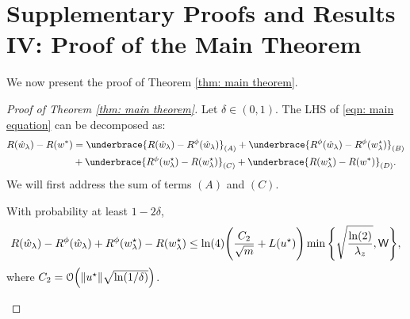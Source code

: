 \section{Supplementary Proofs and Results IV: Proof of the Main Theorem}

We now present the proof of Theorem \ref{thm: main theorem}.

\begin{proof}[Proof of Theorem \ref{thm: main theorem}]
    Let $\delta \in (0,1)$.
    The LHS of \eqref{eqn: main equation} can be decomposed as:
    \begin{equation*}
    \begin{aligned}
        R(\whl) - R(w^*) &=
        \underbrace{R(\whl) - R^\phi(\whl)}_{(A)} +
        \underbrace{R^\phi(\whl) - R^\phi(\wsl)}_{(B)} \\
        &+
        \underbrace{R^\phi(\wsl) - R(\wsl)}_{(C)} +
        \underbrace{R(\wsl) - R(w^*)}_{(D)}.
    \end{aligned}
    \end{equation*}
    We will first address the sum of terms $(A)$ and $(C)$.
    \begin{claim}
       With probability at least $1-2\delta$,
        \begin{equation*}
        \begin{aligned}
            R(\hat{w}_\lambda) - R^\phi(\hat{w}_\lambda) +
            R^\phi(w^\star_{\lambda}) - R(w^\star_{\lambda})
            \leq \ln(4)\Bigg(\frac{C_2}{\sqrt{m}} +
            L(u^\star)\Bigg) \min\Bigg\{\sqrt{\frac{\ln(2)}{\lambda_z}},
            \mathsf{W}\Bigg\},
        \end{aligned}
        \end{equation*}
        where $C_2 = \mathcal{O}\Big(\|u^\star\|\sqrt{\ln(1/\delta)}\Big)$.
    \end{claim}


\end{proof}
